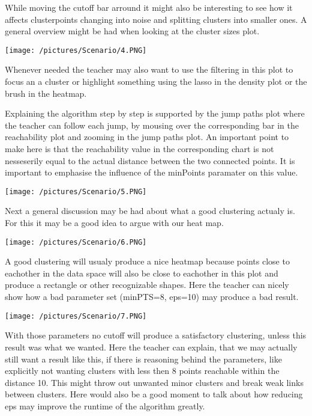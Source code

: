 \documentclass{vgtc}                          %
\begin{document}
\begin{flushleft}
While moving the cutoff bar arround it might also be interesting to see how it affects clusterpoints changing into noise and splitting clusters into smaller ones. A general overview might be had when looking at the cluster sizes plot.
\end{flushleft}
\texttt{[image: /pictures/Scenario/4.PNG]}
\begin{flushleft}
Whenever needed the teacher may also want to use the filtering in this plot to focus an a cluster or highlight something using the lasso in the density plot or the brush in the heatmap.
\end{flushleft}
\begin{flushleft}
Explaining the algorithm step by step is supported by the jump paths plot where the teacher can follow each jump, by mousing over the corresponding bar in the reachability plot and zooming in the jump paths plot. An important point to make here is that the reachability value in the corresponding chart is not nesseserily equal to the actual distance between the two connected points. It is important to emphasise the influence of the minPoints paramater on this value.
\end{flushleft}
\texttt{[image: /pictures/Scenario/5.PNG]}
\begin{flushleft}
Next a general discussion may be had about what a good clustering actualy is. For this it may be a good idea to argue with our heat map.
\end{flushleft}
\texttt{[image: /pictures/Scenario/6.PNG]}
\begin{flushleft}
A good clustering will usualy produce a nice heatmap because points close to eachother in the data space will also be close to eachother in this plot and produce a rectangle or other recognizable shapes. Here the teacher can nicely show how a bad parameter set (minPTS=8, eps=10) may produce a bad result.
\end{flushleft}
\texttt{[image: /pictures/Scenario/7.PNG]}
\begin{flushleft}
With those parameters no cutoff will produce a satisfactory clustering, unless this result was what we wanted. Here the teacher can explain, that we may actually still want a result like this, if there is reasoning behind the parameters, like explicitly not wanting clusters with less then 8 points reachable within the distance 10. This might throw out unwanted minor clusters and break weak links between clusters. Here would also be a good moment to talk about how reducing eps may improve the runtime of the algorithm greatly.
\end{flushleft}
\end{document}
